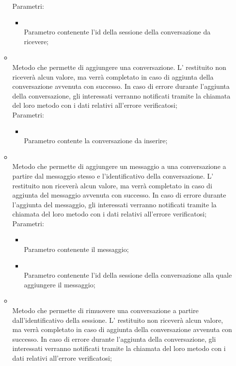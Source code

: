 \begin{itemize}
\begin{itemize}
		Parametri:
		\begin{itemize}
			\item {} \\
			Parametro contenente l'id della sessione della conversazione da ricevere;
		\end{itemize}
		\item[]  \\
		Metodo che permette di aggiungere una conversazione. L' restituito non riceverà alcun valore, ma verrà completato in caso di aggiunta della conversazione avvenuta con successo. In caso di errore durante l'aggiunta della conversazione, gli  interessati verranno notificati tramite la chiamata del loro metodo  con i dati relativi all'errore verificatosi;\\
		Parametri:
		\begin{itemize}
			\item {} \\
			Parametro contente la conversazione da inserire;
		\end{itemize}
		\item[]  \\
		Metodo che permette di aggiungere un messaggio a una conversazione a partire dal messaggio stesso e l'identificativo della conversazione. L' restituito non riceverà alcun valore, ma verrà completato in caso di aggiunta del messaggio avvenuta con successo. In caso di errore durante l'aggiunta del messaggio, gli  interessati verranno notificati tramite la chiamata del loro metodo  con i dati relativi all'errore verificatosi;\\
		Parametri:
		\begin{itemize}
			\item {} \\
			Parametro contenente il messaggio;
			\item {} \\
			Parametro contenente l'id della sessione della conversazione alla quale aggiungere il messaggio;
		\end{itemize}
		\item[]  \\
		Metodo che permette di rimuovere una conversazione a partire dall'identificativo della sessione. L' restituito non riceverà alcun valore, ma verrà completato in caso di aggiunta della conversazione avvenuta con successo. In caso di errore durante l'aggiunta della conversazione, gli  interessati verranno notificati tramite la chiamata del loro metodo  con i dati relativi all'errore verificatosi;\\

\end{itemize}
\end{itemize}

